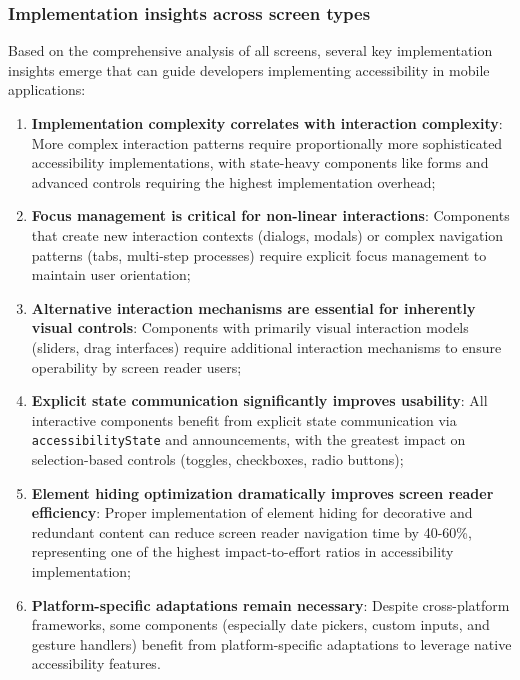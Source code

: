 \subsubsection{Implementation insights across screen types}

Based on the comprehensive analysis of all screens, several key implementation insights emerge that can guide developers implementing accessibility in mobile applications:

\begin{enumerate}
    \item \textbf{Implementation complexity correlates with interaction complexity}: More complex interaction patterns require proportionally more sophisticated accessibility implementations, with state-heavy components like forms and advanced controls requiring the highest implementation overhead;
    
    \item \textbf{Focus management is critical for non-linear interactions}: Components that create new interaction contexts (dialogs, modals) or complex navigation patterns (tabs, multi-step processes) require explicit focus management to maintain user orientation;
    
    \item \textbf{Alternative interaction mechanisms are essential for inherently visual controls}: Components with primarily visual interaction models (sliders, drag interfaces) require additional interaction mechanisms to ensure operability by screen reader users;
    
    \item \textbf{Explicit state communication significantly improves usability}: All interactive components benefit from explicit state communication via \texttt{accessibilityState} and announcements, with the greatest impact on selection-based controls (toggles, checkboxes, radio buttons);
    
    \item \textbf{Element hiding optimization dramatically improves screen reader efficiency}: Proper implementation of element hiding for decorative and redundant content can reduce screen reader navigation time by 40-60\%, representing one of the highest impact-to-effort ratios in accessibility implementation;
    
    \item \textbf{Platform-specific adaptations remain necessary}: Despite cross-platform frameworks, some components (especially date pickers, custom inputs, and gesture handlers) benefit from platform-specific adaptations to leverage native accessibility features.
\end{enumerate}

